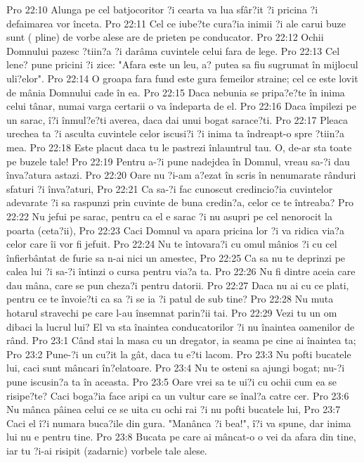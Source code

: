 Pro 22:10  Alunga pe cel batjocoritor ?i cearta va lua sfâr?it ?i pricina ?i defaimarea vor înceta.
Pro 22:11  Cel ce iube?te cura?ia inimii ?i ale carui buze sunt ( pline) de vorbe alese are de prieten pe conducator.
Pro 22:12  Ochii Domnului pazesc ?tiin?a ?i darâma cuvintele celui fara de lege.
Pro 22:13  Cel lene? pune pricini ?i zice: "Afara este un leu, a? putea sa fiu sugrumat în mijlocul uli?elor".
Pro 22:14  O groapa fara fund este gura femeilor straine; cel ce este lovit de mânia Domnului cade în ea.
Pro 22:15  Daca nebunia se pripa?e?te în inima celui tânar, numai varga certarii o va îndeparta de el.
Pro 22:16  Daca împilezi pe un sarac, î?i înmul?e?ti averea, daca dai unui bogat sarace?ti.
Pro 22:17  Pleaca urechea ta ?i asculta cuvintele celor iscusi?i ?i inima ta îndreapt-o spre ?tiin?a mea.
Pro 22:18  Este placut daca tu le pastrezi înlauntrul tau. O, de-ar sta toate pe buzele tale!
Pro 22:19  Pentru a-?i pune nadejdea în Domnul, vreau sa-?i dau înva?atura astazi.
Pro 22:20  Oare nu ?i-am a?ezat în scris în nenumarate rânduri sfaturi ?i înva?aturi,
Pro 22:21  Ca sa-?i fac cunoscut credincio?ia cuvintelor adevarate ?i sa raspunzi prin cuvinte de buna credin?a, celor ce te întreaba?
Pro 22:22  Nu jefui pe sarac, pentru ca el e sarac ?i nu asupri pe cel nenorocit la poarta (ceta?ii),
Pro 22:23  Caci Domnul va apara pricina lor ?i va ridica via?a celor care îi vor fi jefuit.
Pro 22:24  Nu te întovara?i cu omul mânios ?i cu cel înfierbântat de furie sa n-ai nici un amestec,
Pro 22:25  Ca sa nu te deprinzi pe calea lui ?i sa-?i întinzi o cursa pentru via?a ta.
Pro 22:26  Nu fi dintre aceia care dau mâna, care se pun cheza?i pentru datorii.
Pro 22:27  Daca nu ai cu ce plati, pentru ce te învoie?ti ca sa ?i se ia ?i patul de sub tine?
Pro 22:28  Nu muta hotarul stravechi pe care l-au însemnat parin?ii tai.
Pro 22:29  Vezi tu un om dibaci la lucrul lui? El va sta înaintea conducatorilor ?i nu înaintea oamenilor de rând.
Pro 23:1  Când stai la masa cu un dregator, ia seama pe cine ai înaintea ta;
Pro 23:2  Pune-?i un cu?it la gât, daca tu e?ti lacom.
Pro 23:3  Nu pofti bucatele lui, caci sunt mâncari în?elatoare.
Pro 23:4  Nu te osteni sa ajungi bogat; nu-?i pune iscusin?a ta în aceasta.
Pro 23:5  Oare vrei sa te ui?i cu ochii cum ea se risipe?te? Caci boga?ia face aripi ca un vultur care se înal?a catre cer.
Pro 23:6  Nu mânca pâinea celui ce se uita cu ochi rai ?i nu pofti bucatele lui,
Pro 23:7  Caci el î?i numara buca?ile din gura. "Manânca ?i bea!", î?i va spune, dar inima lui nu e pentru tine.
Pro 23:8  Bucata pe care ai mâncat-o o vei da afara din tine, iar tu ?i-ai risipit (zadarnic) vorbele tale alese.

